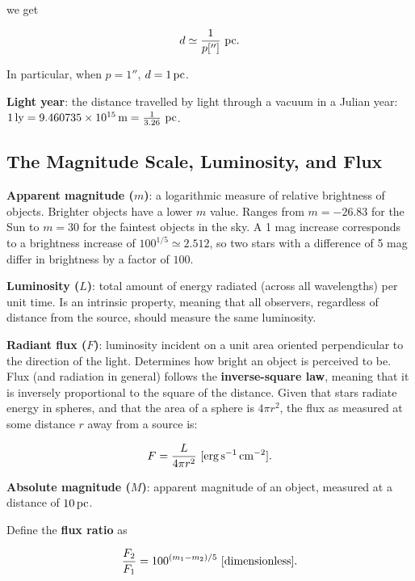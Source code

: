 \documentclass[a4paper,10pt]{article}
\begin{document}
we get

\begin{align*}
    d \simeq \frac{1}{p['']}~{\rm pc}.
\end{align*}

In particular, when $p = 1''$, $d = 1\,{\rm pc}$.

\textbf{Light year}: the distance travelled by light through a vacuum in a Julian year: $1\,{\rm ly} = 9.460735\times 10^{15}\,{\rm m} = \frac{1}{3.26}~{\rm pc}$.

\subsection{The Magnitude Scale, Luminosity, and Flux}

\textbf{Apparent magnitude ($m$)}: a logarithmic measure of relative brightness of objects. Brighter objects have a lower $m$ value. Ranges from $m=-26.83$ for the Sun to $m=30$ for the faintest objects in the sky. A 1 mag increase corresponds to a brightness increase of $100^{1/5} \simeq 2.512$, so two stars with a difference of 5 mag differ in brightness by a factor of $100$. 

\textbf{Luminosity ($L$)}: total amount of energy radiated (across all wavelengths) per unit time. Is an intrinsic property, meaning that all observers, regardless of distance from the source, should measure the same luminosity.

\textbf{Radiant flux ($F$)}: luminosity incident on a unit area oriented perpendicular to the direction of the light. Determines how bright an object is perceived to be. Flux (and radiation in general) follows the \textbf{inverse-square law}, meaning that it is inversely proportional to the square of the distance. Given that stars radiate energy in spheres, and that the area of a sphere is $4\pi r^2$, the flux as measured at some distance $r$ away from a source is:

\begin{align*}
    F = \frac{L}{4\pi r^2}~[{\rm erg\,s^{-1}\,cm^{-2}}].
\end{align*}

\textbf{Absolute magnitude ($M$)}: apparent magnitude of an object, measured at a distance of $10\,{\rm pc}$.

Define the \textbf{flux ratio} as 

\begin{align*}
    \frac{F_2}{F_1} = 100^{(m_1-m_2)/5}~[{\rm dimensionless}].
\end{align*}
\end{document}
